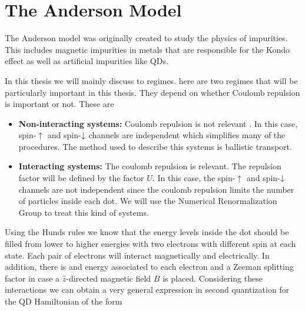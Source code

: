 



\section{The Anderson Model}
The Anderson model \citep{anderson_localized_1961} was originally created to study the physics of impurities. This includes magnetic impurities in metals that are responsible for the Kondo effect as well as artificial impurities like QDs.

 In this thesis we will mainly discuss to regimes. here are two regimes that  will be particularly important in this thesis.  They depend on whether Coulomb repulsion is important or not. These are
\begin{itemize}
    \item \textbf{Non-interacting systems:} Coulomb repulsion is not relevant . In this case, spin-$\uparrow$ and spin-$\downarrow$ channels are independent which simplifies many of the procedures. The method used to describe this systems is ballistic transport. 

    \item \textbf{Interacting systems:} The coulomb repulsion is relevant. The repulsion factor will be defined by the factor $U$. In this case, the spin-$\uparrow$ and spin-$\downarrow$ channels are not independent since the coulomb repulsion limits the number of particles inside each dot. We will use the Numerical Renormalization Group to treat this kind of systems.  
\end{itemize}



Using the Hunds rules we know that the energy levels inside the dot should be filled from lower to higher energies with two electrons with different spin at each state. Each pair of electrons will interact magnetically and electrically. In addition, there is and energy associated to each electron and a Zeeman splitting factor in case a $\hat{z}$-directed magnetic field $B$ is placed.  Considering these interactions we can obtain a very general expression in second quantization for the QD Hamiltonian
of the form \citep[(3.2)]{sindel_numerical_2005}

